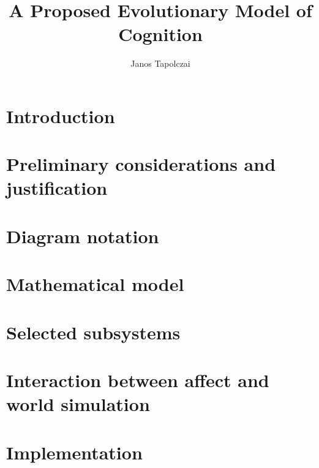 \documentclass[]{scrartcl}
\title{{\huge A Proposed Evolutionary Model of Cognition}}
\author{Janos Tapolczai}
\begin{document}
\maketitle


\begin{abstract}

\end{abstract}

\tableofcontents
\newpage

\begingroup
\let\clearpage\relax

\section{Introduction}



\section{Preliminary considerations and justification}\label{sec:preliminaries}



\section{Diagram notation}



\section{Mathematical model}\label{sec:mathematicalModel}



\section{Selected subsystems}\label{sec:selectedSubsystems}



\section{Interaction between affect and world simulation}



\section{Implementation}



\endgroup

\pagebreak

\nocite{*}



\end{document}
